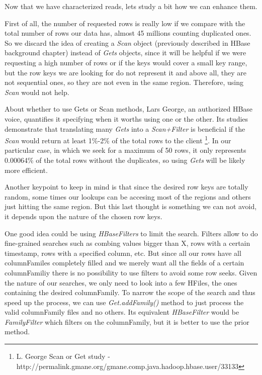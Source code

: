 Now that we have characterized reads, lets study a bit how we can enhance them. 
\par
First of all, the number of requested rows is really low if we compare with the total number of rows our data has, almost 45 millions counting duplicated ones. So we discard the idea of creating a \textit{Scan} object (previously described in HBase background chapter) instead of \textit{Gets} objects, since it will be helpful if we were requesting a high number of rows or if the keys would cover a small key range, but the row keys we are looking for do not represent it and above all, they are not sequential ones, so they are not even in the same region. Therefore, using \textit{Scan} would not help. 
\par
About whether to use Gets or Scan methods, Lars George, an authorized HBase voice, quantifies it specifying when it worths using one or the other. Its studies demonstrate that translating many \textit{Gets} into a \textit{Scan+Filter} is beneficial if the \textit{Scan} would return at least 1\%-2\% of the total rows to the client \footnote{ L. George Scan or Get study - http://permalink.gmane.org/gmane.comp.java.hadoop.hbase.user/33133}. In our particular case, in which we seek for a maximum of 50 rows, it only represents 0.00064\% of the total rows without the duplicates, so using \textit{Gets} will be likely more efficient.
\par
Another keypoint to keep in mind is that since the desired row keys are totally random, some times our lookups can be accesing most of the regions and others just hitting the same region. But this last thought is something we can not avoid, it depends upon the nature of the chosen row keys.
\par
One good idea could be using \textit{HBaseFilters} to limit the search. Filters allow to do fine-grained searches such as combing values bigger than X, rows with a certain timestamp, rows with a specified column, etc. But since all our rows have all columnFamiles completely filled and we merely want all the fields of a certain columnFamiliy there is no possibility to use filters to avoid some row seeks. Given the nature of our searches, we only need to look into a few HFiles, the ones containing the desired columnFamily. To narrow the scope of the search and thus speed up the process, we can use \textit{Get.addFamily()} method to just process the valid columnFamily files and no others. Its equivalent \textit{HBaseFilter} would be \textit{FamilyFilter} which filters on the columnFamily, but it is better to use the prior method.
\par

